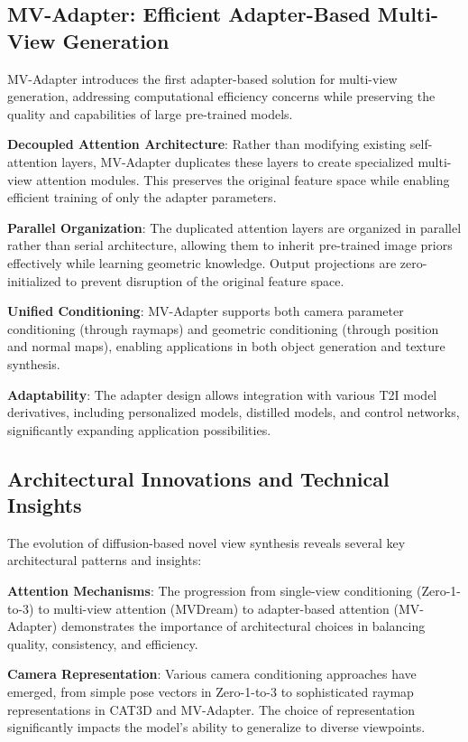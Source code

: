 \subsection{MV-Adapter: Efficient Adapter-Based Multi-View Generation}

MV-Adapter \cite{mvadapter} introduces the first adapter-based solution for multi-view generation, addressing computational efficiency concerns while preserving the quality and capabilities of large pre-trained models.

\textbf{Decoupled Attention Architecture}: Rather than modifying existing self-attention layers, MV-Adapter duplicates these layers to create specialized multi-view attention modules. This preserves the original feature space while enabling efficient training of only the adapter parameters.

\textbf{Parallel Organization}: The duplicated attention layers are organized in parallel rather than serial architecture, allowing them to inherit pre-trained image priors effectively while learning geometric knowledge. Output projections are zero-initialized to prevent disruption of the original feature space.

\textbf{Unified Conditioning}: MV-Adapter supports both camera parameter conditioning (through raymaps) and geometric conditioning (through position and normal maps), enabling applications in both object generation and texture synthesis.

\textbf{Adaptability}: The adapter design allows integration with various T2I model derivatives, including personalized models, distilled models, and control networks, significantly expanding application possibilities.

\subsection{Architectural Innovations and Technical Insights}

The evolution of diffusion-based novel view synthesis reveals several key architectural patterns and insights:

\textbf{Attention Mechanisms}: The progression from single-view conditioning (Zero-1-to-3) to multi-view attention (MVDream) to adapter-based attention (MV-Adapter) demonstrates the importance of architectural choices in balancing quality, consistency, and efficiency.

\textbf{Camera Representation}: Various camera conditioning approaches have emerged, from simple pose vectors in Zero-1-to-3 to sophisticated raymap representations in CAT3D and MV-Adapter. The choice of representation significantly impacts the model's ability to generalize to diverse viewpoints.

